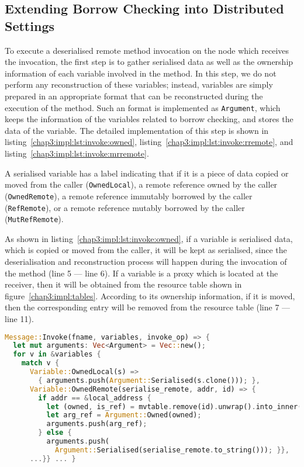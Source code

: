 \subsection{Extending Borrow Checking into Distributed Settings}
\label{chap3:impl:borrow}
To execute a deserialised remote method invocation on the node which receives the invocation, the first step is to gather serialised data as well as the ownership information of each variable involved in the method. In this step, we do not perform any reconstruction of these variables; instead, variables are simply prepared in an appropriate format that can be reconstructed during the execution of the method. Such an format is implemented as \texttt{Argument}, which keeps the information of the variables related to borrow checking, and stores the data of the variable. The detailed implementation of this step is shown in listing~\ref{chap3:impl:lst:invoke:owned}, listing~\ref{chap3:impl:lst:invoke:rremote}, and listing~\ref{chap3:impl:lst:invoke:mrremote}.

A serialised variable has a label indicating that if it is a piece of data copied or moved from the caller (\texttt{OwnedLocal}), a remote reference owned by the caller (\texttt{OwnedRemote}), a remote reference immutably borrowed by the caller (\texttt{RefRemote}), or a remote reference mutably borrowed by the caller (\texttt{MutRefRemote}).

As shown in listing~\ref{chap3:impl:lst:invoke:owned}, if a variable is serialised data, which is copied or moved from the caller, it will be kept as serialised, since the deserialisation and reconstruction process will happen during the invocation of the method (line 5 --- line 6).
If a variable is a proxy which is located at the receiver, then it will be obtained from the resource table shown in figure~\ref{chap3:impl:tables}. According to its ownership information, if it is moved, then the corresponding entry will be removed from the resource table (line 7 --- line 11).
\begin{lstlisting}[language=Rust, style=boxed, basicstyle=\footnotesize\ttfamily, caption={Gathering variables from an invocation message: \texttt{OwnedLocal} and \texttt{OwnedRemote}}, label=chap3:impl:lst:invoke:owned]
Message::Invoke(fname, variables, invoke_op) => {
  let mut arguments: Vec<Argument> = Vec::new();
  for v in &variables {
    match v {
      Variable::OwnedLocal(s) => 
        { arguments.push(Argument::Serialised(s.clone())); },
      Variable::OwnedRemote(serialise_remote, addr, id) => {
        if addr == &local_address {
          let (owned, is_ref) = mvtable.remove(id).unwrap().into_inner();
          let arg_ref = Argument::Owned(owned);
          arguments.push(arg_ref);
        } else { 
          arguments.push(
            Argument::Serialised(serialise_remote.to_string())); }},
      ...}} ... }
\end{lstlisting}

